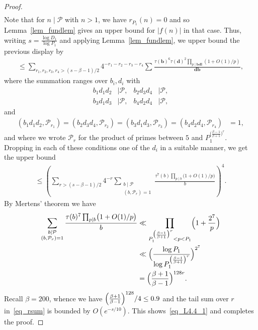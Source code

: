 \documentclass[12pt]{amsart}
\theoremstyle{definition}
\theoremstyle{remark}
\numberwithin{equation}{section}
\newcommand{\1}{\mathbf{1}}
\begin{document}
\begin{proof}
\begin{align*}
	\end{align*}
    Note that for $n\mid \mathcal{P}$ with $n>1$, we have $r_{P_1}(n)=0$ and so Lemma~\ref{lem_fundlem} gives an upper bound for $|f(n)|$ in that case. Thus, writing $s=\frac{\log D_1}{\log P_1}$ and applying Lemma~\ref{lem_fundlem}, we upper bound the previous display by
	\begin{align*}
		\leq \sum_{r_1, r_2, r_3, r_4 > (s-\beta-1)/2} 4^{-r_1-r_2-r_3-r_4} \sum_{}\frac{\tau(\mathbf{b})^6 \tau(\mathbf{d})^2\prod_{p\mid \mathbf{bd}\mathbf{l}}\left(1+O(1)/p\right)}{\mathbf{db}},
	\end{align*}
	where the summation ranges over $b_i, d_i$ with
	\begin{align*}
		b_1d_1d_2&\mid \mathcal{P},&
		b_2d_3d_4&\mid \mathcal{P}, \\
		b_3d_1d_3&\mid \mathcal{P},&
		b_4d_2d_4&\mid \mathcal{P},
        \end{align*}
        and
        \begin{align*}
		(b_1d_1d_2,\mathcal{P}_{r_1})=
		(b_2d_3d_4,\mathcal{P}_{r_2})=
		(b_3d_1d_3,\mathcal{P}_{r_3})=
		(b_4d_2d_4,\mathcal{P}_{r_4})&=1,
	\end{align*}
    and where we wrote $\mathcal{P}_r$ for the product of primes between $5$ and $P_1^{\bigl(\frac{\beta-1}{\beta+1}\bigr)^r}$. Dropping in each of these conditions one of the $d_i$ in a suitable manner, we get the upper bound
	\begin{align}\label{eq_rsum}
		\leq \left(\sum_{r> (s-\beta-1)/2} 4^{-r}\sum_{\substack{b\mid \mathcal{P}\\ (b,\mathcal{P}_r)=1}} \frac{\tau^7(b) \prod_{p\mid b}\bigl(1+O(1)/p\bigr) }{b}\right)^4.
	\end{align}
	By Mertens' theorem we have
	\begin{align*}
		\sum_{\substack{b\mid \mathcal{P}\\ (b,\mathcal{P}_r)=1}}\frac{\tau(b)^{7}\prod_{p\mid b}\bigl(1+O(1)/p\bigr)}{b}&\ll \prod_{P_1^{\bigl(\frac{\beta-1}{\beta+1}\bigr)^r}<p< P_1}\Bigl(1+\frac{2^7}{p}\Bigr)\\
		&\ll \Bigl(\frac{\log P_1}{\log P_1^{\bigl(\frac{\beta-1}{\beta+1}\bigr)^r}} \Bigr)^{2^{7}}\\
		&= \Bigl(\frac{\beta+1}{\beta-1} \Bigr)^{128 r}.
	\end{align*}
	Recall $\beta=200$, whence we have $\Bigl(\frac{\beta+1}{\beta-1} \Bigr)^{128}/4\leq 0.9$ and the tail sum over $r$ in~\eqref{eq_rsum} is bounded by $O(e^{-s/10})$. This shows~\eqref{eq_L4.4_1} and completes the proof.
\end{proof}
	
\end{document}
